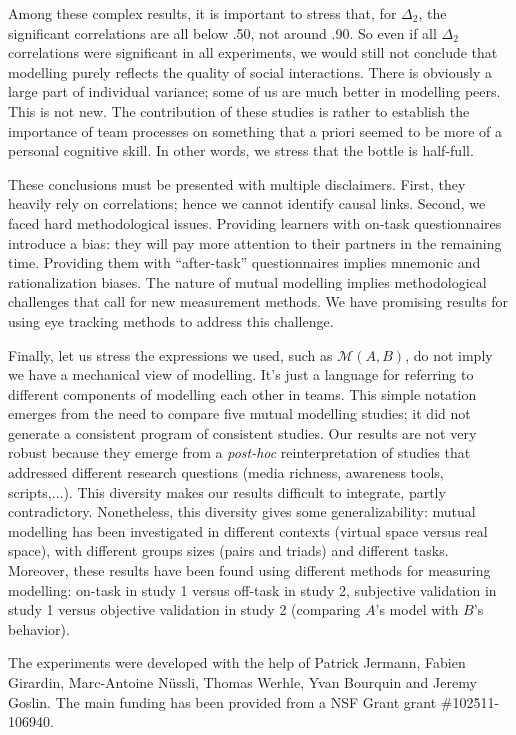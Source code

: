\documentclass[natbib]{svjour3}
\newcommand{\gmodel}[2]{{$\mathcal{M}(#1, #2)$}}
\begin{document}
Among these complex results, it is important to stress that, for $\Delta_2$, the
significant correlations are all below .50, not around .90.  So even if all
$\Delta_2$ correlations were significant in all experiments, we would still not
conclude that modelling purely reflects the quality of social interactions.
There is obviously a large part of individual variance; some of us are much
better in modelling peers. This is not new. The contribution of these studies is
rather to establish the importance of team processes on something that a priori
seemed to be more of a personal cognitive skill.  In other words, we stress that
the bottle is half-full. 

These conclusions must be presented with multiple disclaimers. First, they
heavily rely on correlations; hence we cannot identify causal links. Second, we
faced hard methodological issues. Providing learners with on-task questionnaires
introduce a bias: they will pay more attention to their partners in the
remaining time. Providing them with ``after-task'' questionnaires implies mnemonic
and rationalization biases. The nature of mutual modelling implies methodological
challenges that call for new  measurement methods. We have promising results for
using eye tracking methods to address this challenge.

Finally, let us stress the expressions we used, such as \gmodel{A}{B}, do not
imply we have a mechanical view of modelling. It's just a language for referring
to different components of modelling each other in teams.  This simple notation
emerges from the need to compare five mutual modelling studies; it did not
generate a consistent program of consistent studies.  Our results are not very
robust because they emerge from a \emph{post-hoc} reinterpretation of studies
that addressed different research questions (media richness, awareness tools,
scripts,...). This diversity makes our results difficult to integrate, partly
contradictory. Nonetheless, this diversity gives some generalizability: mutual
modelling has been investigated in different contexts (virtual space versus real
space), with different groups sizes (pairs and triads) and different tasks.
Moreover, these results have been found using different methods for measuring
modelling: on-task in study 1 versus off-task in study 2, subjective validation
in study 1 versus objective validation in study 2 (comparing $A$'s model with $B$'s
behavior).

\begin{acknowledgements}

The experiments were developed with the help of Patrick Jermann,  Fabien
Girardin, Marc-Antoine Nüssli, Thomas Werhle, Yvan Bourquin and  Jeremy Goslin.
The main funding has been provided from a NSF Grant grant \#102511-106940.

\end{acknowledgements}



\end{document}
